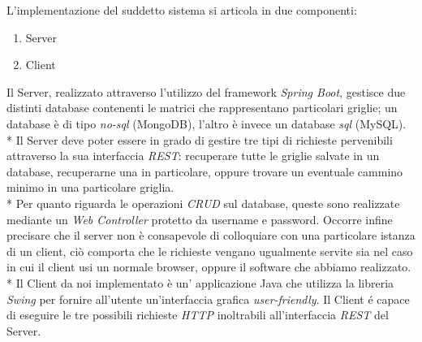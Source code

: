\newpage
L'implementazione del suddetto sistema si articola in due componenti:
\begin{enumerate}
	\item Server
	\item Client
\end{enumerate}
Il Server, realizzato attraverso l'utilizzo del framework \emph{Spring Boot}, gestisce due distinti database contenenti le matrici che rappresentano particolari griglie; un database \`e di tipo \emph{no-sql} (MongoDB), l'altro \`e invece un database \emph{sql} (MySQL).\\*
Il Server deve poter essere in grado di gestire tre tipi di richieste pervenibili attraverso la sua interfaccia \emph{REST}: recuperare tutte le griglie salvate in un database, recuperarne una in particolare, oppure trovare un eventuale cammino minimo in una particolare griglia.\\*
Per quanto riguarda le operazioni \emph{CRUD} sul database, queste sono realizzate mediante un \emph{Web Controller} protetto da username e password. Occorre infine precisare che il server non \`e consapevole di colloquiare con una particolare istanza di un client, ci\`o comporta che le richieste vengano ugualmente servite sia nel caso in cui il client usi un normale browser, oppure il software che abbiamo realizzato.\\*
Il Client da noi implementato \`e un' applicazione Java che utilizza la libreria \emph{Swing} per fornire all'utente un'interfaccia grafica \emph{user-friendly}. Il Client \'e capace di eseguire le tre possibili richieste \emph{HTTP} inoltrabili all'interfaccia \emph{REST} del Server.

